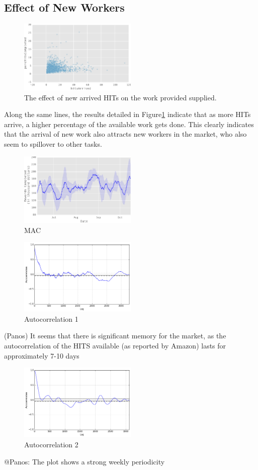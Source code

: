 \subsection{Effect of New Workers}
\begin{figure}[htbp]
	\centering
		\includegraphics[width=0.5\textwidth]{figures/percHitsCompleted}
	\caption{The effect of new arrived HITs on the work provided supplied.}
	\label{fig:perc_hits_completed}
\end{figure}
Along the same lines, the results detailed in Figure\ref{fig:perc_hits_completed} indicate that as more HITs arrive, a higher percentage of the available work gets done. 
This clearly indicates that the arrival of new work also attracts new workers
in the market, who also seem to spillover to other tasks.

\begin{figure}[htbp]
	\centering
		\includegraphics[width=0.5\textwidth]{figures/mac}
	\caption{MAC}
	\label{fig:mac}
\end{figure}
\begin{figure}[htbp]
	\centering
		\includegraphics[width=0.5\textwidth]{figures/autocorrelation_plot}
	\caption{Autocorrelation  1}
	\label{fig:autocorrelation1}
\end{figure}
(Panos) It seems that there is significant memory for the market, as the autocorrelation of the 
HITS available (as reported by Amazon) lasts for approximately 7-10 days

\begin{figure}[htbp]
	\centering
		\includegraphics[width=0.5\textwidth]{figures/autocorrelation2}
	\caption{Autocorrelation 2}
	\label{fig:autocorrelation2}
\end{figure}

@Panos: The plot shows a strong weekly periodicity
